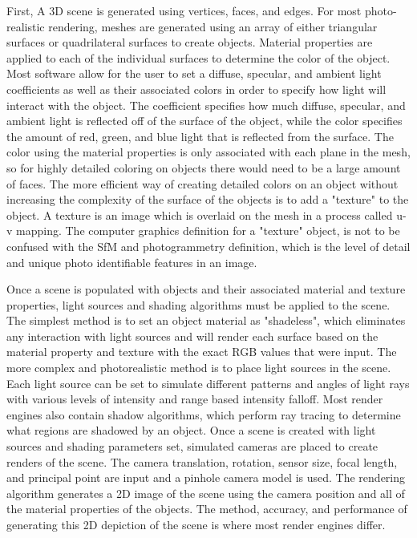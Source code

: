 First, A 3D scene is generated using vertices, faces, and edges.  For most photo-realistic rendering, meshes are generated using an array of either triangular surfaces or quadrilateral surfaces to create objects.  Material properties are applied to each of the individual surfaces to determine the color of the object.  Most software allow for the user to set a diffuse, specular, and ambient light coefficients as well as their associated colors in order to specify how light will interact with the object.  The coefficient specifies how much diffuse, specular, and ambient light is reflected off of the surface of the object, while the color specifies the amount of red, green, and blue light that is reflected from the surface.  The color using the material properties is only associated with each plane in the mesh, so for highly detailed coloring on objects there would need to be a large amount of faces.  The more efficient way of creating detailed colors on an object without increasing the complexity of the surface of the objects is to add a "texture" to the object.  A texture is an image which is overlaid on the mesh in a process called u-v mapping.  The computer graphics definition for a "texture" object, is not to be confused with the SfM and photogrammetry definition, which is the level of detail and unique photo identifiable features in an image.

Once a scene is populated with objects and their associated material and texture properties, light sources and shading algorithms must be applied to the scene.  The simplest method is to set an object material as "shadeless", which eliminates any interaction with light sources and will render each surface based on the material property and texture with the exact RGB values that were input.  The more complex and photorealistic method is to place light sources in the scene.  Each light source can be set to simulate different patterns and angles of light rays with various levels of intensity and range based intensity falloff.  Most render engines also contain shadow algorithms, which perform ray tracing to determine what regions are shadowed by an object.  Once a scene is created with light sources and shading parameters set, simulated cameras are placed to create renders of the scene. The camera translation, rotation, sensor size, focal length, and principal point are input and a pinhole camera model is used.  The rendering algorithm generates a 2D image of the scene using the camera position and all of the material properties of the objects. The method, accuracy, and performance of generating this 2D depiction of the scene is where most render engines differ. 

